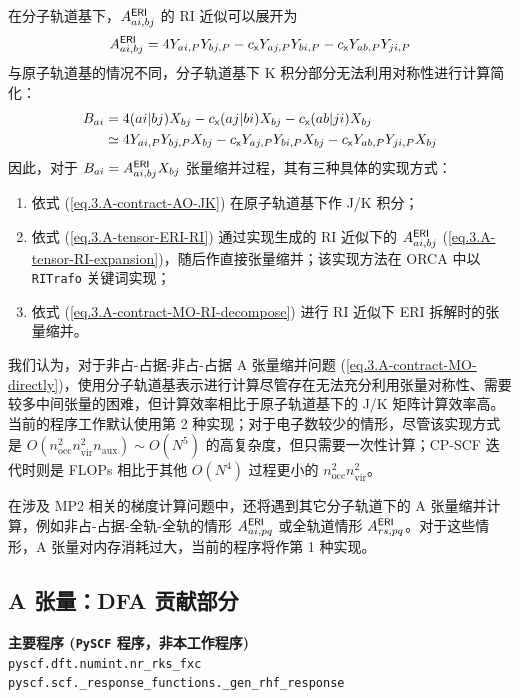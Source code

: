 在分子轨道基下，$A_{ai, bj}^{\textsf{ERI}}$ 的 RI 近似可以展开为
\begin{equation}
    \label{eq.3.A-tensor-ERI-RI}
    A_{ai, bj}^{\textsf{ERI}} = 4 Y_{ai, P} Y_{bj, P} - c_{\textsf{x}} Y_{aj, P} Y_{bi, P} - c_{\textsf{x}} Y_{ab, P} Y_{ji, P}
\end{equation}
与原子轨道基的情况不同，分子轨道基下 K 积分部分无法利用对称性进行计算简化：
\begin{align}
    \label{eq.3.A-contract-MO-RI-decompose}
    B_{ai} &= 4 (ai | bj) X_{bj} - c_{\textsf{x}} (aj | bi) X_{bj} - c_{\textsf{x}} (ab | ji) X_{bj} \notag\\
    &\simeq 4 Y_{ai, P} Y_{bj, P} X_{bj} - c_{\textsf{x}} Y_{aj, P} Y_{bi, P} X_{bj} - c_{\textsf{x}} Y_{ab, P} Y_{ji, P} X_{bj}
\end{align}
因此，对于 $B_{ai} = A_{ai, bj}^{\textsf{ERI}} X_{bj}$ 张量缩并过程，其有三种具体的实现方式：
\begin{enumerate}[nosep]
    \item 依式 (\ref{eq.3.A-contract-AO-JK}) 在原子轨道基下作 J/K 积分；
    \item 依式 (\ref{eq.3.A-tensor-ERI-RI}) 通过实现生成的 RI 近似下的 $A_{ai, bj}^{\textsf{ERI}}$ (\ref{eq.3.A-tensor-RI-expansion})，随后作直接张量缩并；该实现方法在 ORCA 中以 \verb|RITrafo| 关键词实现；
    \item 依式 (\ref{eq.3.A-contract-MO-RI-decompose}) 进行 RI 近似下 ERI 拆解时的张量缩并。
\end{enumerate}
我们认为，对于非占-占据-非占-占据 A 张量缩并问题 (\ref{eq.3.A-contract-MO-directly})，使用分子轨道基表示进行计算尽管存在无法充分利用张量对称性、需要较多中间张量的困难，但计算效率相比于原子轨道基下的 J/K 矩阵计算效率高。当前的程序工作默认使用第 2 种实现；对于电子数较少的情形，尽管该实现方式是 $O(n_\mathrm{occ}^2 n_\mathrm{vir}^2 n_\mathrm{aux}) \sim O(N^5)$ 的高复杂度，但只需要一次性计算；CP-SCF 迭代时则是 FLOPs 相比于其他 $O(N^4)$ 过程更小的 $n_\mathrm{occ}^2 n_\mathrm{vir}^2$。

在涉及 MP2 相关的梯度计算问题中，还将遇到其它分子轨道下的 A 张量缩并计算，例如非占-占据-全轨-全轨的情形 $A_{ai, pq}^{\textsf{ERI}}$ 或全轨道情形 $A_{rs, pq}^{\textsf{ERI}}$。对于这些情形，A 张量对内存消耗过大，当前的程序将作第 1 种实现。

\subsection{A 张量：DFA 贡献部分}
\label{sec.3.a-tensor-dfa}

\begin{tcolorbox}
    \textbf{主要程序 (\texttt{PySCF} 程序，非本工作程序)}\\
    \verb|pyscf.dft.numint.nr_rks_fxc|\\
    \verb|pyscf.scf._response_functions._gen_rhf_response|
\end{tcolorbox}

